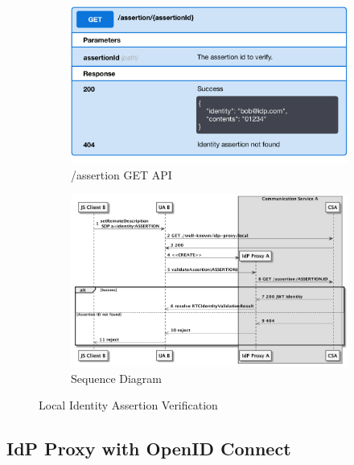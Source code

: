 \begin{figure}[tbp]
\begin{subfigure}{\textwidth}
\begin{center}
    \includegraphics[scale=0.5]{images/localProxyAPIGET}
\caption{/assertion GET API}
\label{idpproxyimplem:getapi}
\end{center}
\end{subfigure}

\begin{subfigure}{\overflowingheadlen}
\centering
    \includegraphics[scale=0.55]{images/localAuthVerif}
\caption{Sequence Diagram}
\label{localAuthVerif:seq}
\end{subfigure}
\caption{Local Identity Assertion Verification}
\label{localAuthVerif}
\end{figure}


\subsection{IdP Proxy with OpenID Connect}
\label{sec:idpoidc}

